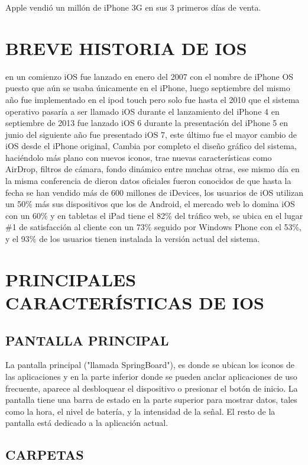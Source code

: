 Apple vendió un millón de iPhone 3G en sus 3 primeros días de
venta.

\section*{BREVE HISTORIA DE IOS}
en un comienzo iOS fue lanzado en enero del 2007 con el
nombre de iPhone OS puesto que aún se usaba únicamente en el
iPhone, luego septiembre del mismo año fue implementado en
el ipod touch pero solo fue hasta el 2010 que el sistema
operativo pasaría a ser llamado iOS durante el lanzamiento del
iPhone 4 en septiembre de 2013 fue lanzado iOS 6 durante la
presentación del iPhone 5 en junio del siguiente año fue
presentado iOS 7, este último fue el mayor cambio de iOS desde
el iPhone original, Cambia por completo el diseño gráfico del
sistema, haciéndolo más plano con nuevos iconos, trae nuevas
características como AirDrop, filtros de cámara, fondo dinámico
entre muchas otras, ese mismo día en la misma conferencia de
dieron datos oficiales fueron conocidos de que hasta la fecha se
han vendido más de 600 millones de iDevices, los usuarios de
iOS utilizan un 50\% más sus dispositivos que los de Android, el
mercado web lo domina iOS con un 60\% y en tabletas el iPad
tiene el 82\% del tráfico web, se ubica en el lugar \#1 de
satisfacción al cliente con un 73\% seguido por Windows Phone
con el 53\%, y el 93\% de los usuarios tienen instalada la versión
actual del sistema.

\section*{PRINCIPALES CARACTERÍSTICAS DE IOS}
\subsection*{PANTALLA PRINCIPAL}

La pantalla principal ("llamada SpringBoard"), es donde se
ubican los iconos de las aplicaciones y en la parte inferior
donde se pueden anclar aplicaciones de uso frecuente, aparece
al desbloquear el dispositivo o presionar el botón de inicio. La
pantalla tiene una barra de estado en la parte superior para
mostrar datos, tales como la hora, el nivel de batería, y la
intensidad de la señal. El resto de la pantalla está dedicado a la
aplicación actual.

\subsection*{CARPETAS}

